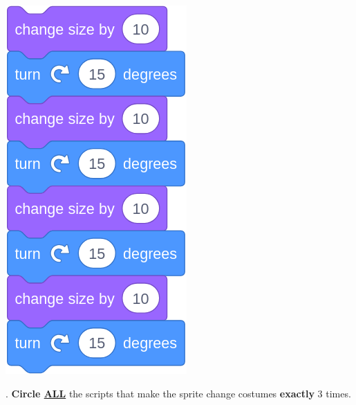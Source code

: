 \documentclass[letterpaper,12pt]{article}
\begin{document}
\includegraphics[scale=.3,valign=t]{q2_script4.png} \hspace{1.25cm} \\

\noindent \dotfill

. \textbf{Circle \underline{ALL}} the scripts that make the sprite change costumes \textbf{exactly} 3 times. \\
\end{document}
